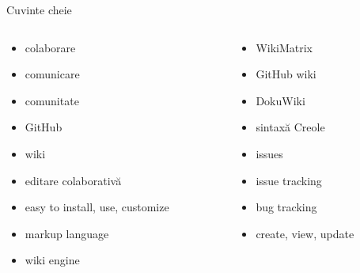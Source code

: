\documentclass{beamer}
\begin{document}
\begin{frame}{Cuvinte cheie}
  \begin{columns}
    \begin{column}[l]{0.5\textwidth}
      \begin{itemize}
        \item colaborare
        \item comunicare
        \item comunitate
        \item GitHub
        \item wiki
        \item editare colaborativă
        \item easy to install, use, customize
        \item markup language
        \item wiki engine
      \end{itemize}
    \end{column}
    \begin{column}[l]{0.5\textwidth}
      \begin{itemize}
        \item WikiMatrix
        \item GitHub wiki
        \item DokuWiki
        \item sintaxă Creole
        \item issues
        \item issue tracking
        \item bug tracking
        \item create, view, update
      \end{itemize}
    \end{column}
  \end{columns}
\end{frame}
\end{document}
